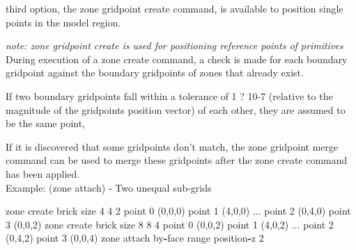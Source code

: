 \documentclass[a4paper, nobind]{templates/ociamthesis}
\newenvironment{Shaded}{\begin{snugshade}}{\end{snugshade}}
\newcommand{\BuiltInTok}[1]{#1}
\newcommand{\DecValTok}[1]{\textcolor[rgb]{0.00,0.00,0.81}{#1}}
\newcommand{\NormalTok}[1]{#1}
\newcommand{\OperatorTok}[1]{\textcolor[rgb]{0.81,0.36,0.00}{\textbf{#1}}}
\renewenvironment{Shaded}
{
  \vspace{10pt}%
  \begin{snugshade}%
}{%
  \end{snugshade}%
  \vspace{8pt}%
}
\begin{document}
third option, the zone gridpoint create command, is available to
position single points in the model region.

\hfill\break
\emph{note: zone gridpoint create is used for positioning reference points of
primitives}\\

During execution of a zone create command, a check is made for each
boundary gridpoint against the boundary gridpoints of zones that already
exist.

\hfill\break
If two boundary gridpoints fall within a tolerance of 1 ? 10-7 (relative
to the magnitude of the gridpoints position vector) of each other, they
are assumed to be the same point,

\hfill\break
If it is discovered that some gridpoints don't match, the zone gridpoint
merge command can be used to merge these gridpoints after the zone
create command has been applied.\\

Example: (zone attach) - Two unequal sub-grids

\begin{Shaded}
\begin{Highlighting}[]
\NormalTok{zone create brick size }\DecValTok{4} \DecValTok{4} \DecValTok{2}\NormalTok{ point }\DecValTok{0}\NormalTok{ (}\DecValTok{0}\NormalTok{,}\DecValTok{0}\NormalTok{,}\DecValTok{0}\NormalTok{) point }\DecValTok{1}\NormalTok{ (}\DecValTok{4}\NormalTok{,}\DecValTok{0}\NormalTok{,}\DecValTok{0}\NormalTok{) ...}
\NormalTok{                             point }\DecValTok{2}\NormalTok{ (}\DecValTok{0}\NormalTok{,}\DecValTok{4}\NormalTok{,}\DecValTok{0}\NormalTok{) point }\DecValTok{3}\NormalTok{ (}\DecValTok{0}\NormalTok{,}\DecValTok{0}\NormalTok{,}\DecValTok{2}\NormalTok{)}
\NormalTok{zone create brick size }\DecValTok{8} \DecValTok{8} \DecValTok{4}\NormalTok{ point }\DecValTok{0}\NormalTok{ (}\DecValTok{0}\NormalTok{,}\DecValTok{0}\NormalTok{,}\DecValTok{2}\NormalTok{) point }\DecValTok{1}\NormalTok{ (}\DecValTok{4}\NormalTok{,}\DecValTok{0}\NormalTok{,}\DecValTok{2}\NormalTok{) ...}
\NormalTok{                             point }\DecValTok{2}\NormalTok{ (}\DecValTok{0}\NormalTok{,}\DecValTok{4}\NormalTok{,}\DecValTok{2}\NormalTok{) point }\DecValTok{3}\NormalTok{ (}\DecValTok{0}\NormalTok{,}\DecValTok{0}\NormalTok{,}\DecValTok{4}\NormalTok{)}
\NormalTok{zone attach by}\OperatorTok{{-}}\NormalTok{face }\BuiltInTok{range}\NormalTok{ position}\OperatorTok{{-}}\NormalTok{z }\DecValTok{2}
\end{Highlighting}
\end{Shaded}
\end{document}
